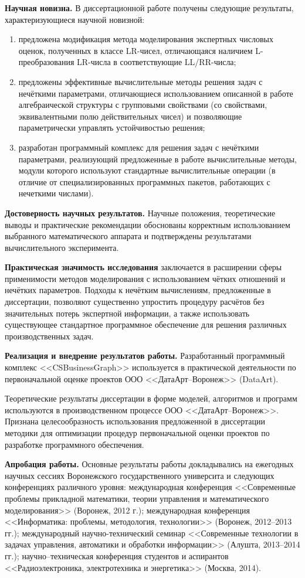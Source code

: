 \textbf{Научная новизна.} В диссертационной работе получены следующие результаты, характеризующиеся научной новизной:
\begin{enumerate}
  \item предложена модификация метода моделирования экспертных числовых оценок, полученных в классе LR-чисел, отличающаяся наличием L-преобразования LR-числа в соответствующие LL/RR-числа;
  \item предложены эффективные вычислительные методы решения задач с нечёткими параметрами, отличающиеся использованием описанной в работе алгебраической структуры с групповыми свойствами (со свойствами, эквивалентными полю действительных чисел) и позволяющие параметрически управлять устойчивостью решения;
  \item разработан программный комплекс для решения задач с нечёткими параметрами, реализующий предложенные в работе вычислительные методы, модули которого используют стандартные вычислительные операции (в отличие от специализированных программных пакетов, работающих с нечеткими числами).
\end{enumerate}

\textbf{Достоверность научных результатов.} Научные положения, теоретические выводы и практические рекомендации обоснованы корректным использованием выбранного математического аппарата и подтверждены результатами вычислительного эксперимента.

\textbf{Практическая значимость исследования} заключается в расширении сферы применимости методов моделирования с использованием чётких отношений и нечётких параметров. Подходы к нечётким вычислениям, предложенные в диссертации, позволяют существенно упростить процедуру расчётов без значительных потерь экспертной информации, а также использовать существующее стандартное программное обеспечение для решения различных производственных задач.

\textbf{Реализация и внедрение результатов работы.} Разработанный программный комплекс <<CSBusinessGraph>> используется в практической деятельности по первоначальной оценке проектов ООО <<ДатаАрт--Воронеж>> (DataArt).

Теоретические результаты диссертации в форме моделей, алгоритмов и программ используются в производственном процессе ООО <<ДатаАрт--Воронеж>>. Признана целесообразность использования предложенной в диссертации методики для оптимизации процедур первоначальной оценки проектов по разработке программного обеспечения.

\textbf{Апробация работы.} Основные результаты работы докладывались на ежегодных научных сессиях Воронежского государственного университа и следующих конференциях различного уровня: международная конференция <<Современные проблемы прикладной математики, теории управления и математического моделирования>> (Воронеж, 2012 г.); международная конференция <<Информатика: проблемы, методология, технологии>> (Воронеж, 2012--2013 гг.); международный научно-технический семинар <<Современные технологии в задачах управления, автоматики и обработки информации>> (Алушта, 2013--2014 гг.); научно--техническая конференция студентов и аспирантов <<Радиоэлектроника, электротехника и энергетика>> (Москва, 2014).

